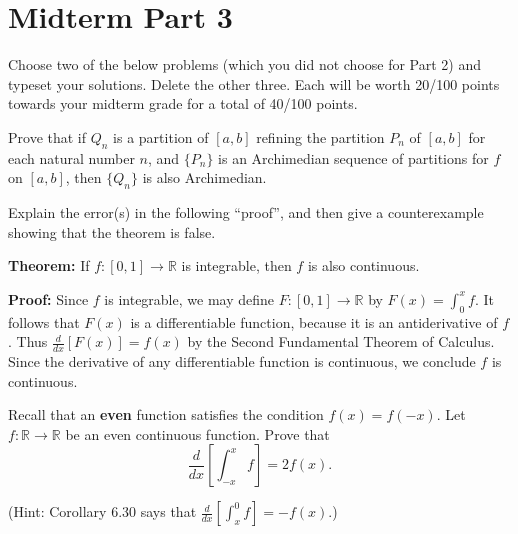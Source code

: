 \documentclass[letterpaper, twoside, 12pt]{book}
\begin{document}
\chapter*{Midterm Part 3}

Choose two of the below problems (which you did not choose for
Part 2) and typeset your solutions. Delete the other three.
Each will be worth 20/100 points towards your midterm grade
for a total of 40/100 points.


\begin{exercise}[1]
Prove that if \(Q_n\) is a partition of \([a,b]\) refining
the partition \(P_n\) of \([a,b]\) for each
natural number \(n\), and \(\{P_n\}\) is an Archimedian sequence of
partitions for \(f\) on \([a,b]\), then \(\{Q_n\}\) is also Archimedian.
\end{exercise}
\begin{solution}

\end{solution}

\begin{exercise}[2]
Explain the error(s) in the following ``proof'',
and then give a counterexample showing that the theorem is false.

\textbf{Theorem:} If \(f:[0,1]\to\mathbb R\) is integrable, then
\(f\) is also continuous.

\textbf{Proof:}
Since \(f\) is integrable, we may define \(F:[0,1]\to\mathbb R\)
by \(F(x)=\int_0^x f\). It follows
that \(F(x)\) is a differentiable function, because it is an antiderivative
of \(f\). Thus \(\frac{d}{dx}[F(x)]=f(x)\) by the Second Fundamental
Theorem of Calculus. Since the derivative of any differentiable function
is continuous, we conclude \(f\) is continuous.
\end{exercise}
\begin{solution}

\end{solution}

\begin{exercise}[3]
Recall that an \textbf{even} function satisfies the condition \(f(x)=f(-x)\).
Let \(f:\mathbb R\to\mathbb R\) be an even continuous function.
Prove that
\[
  \frac{d}{dx}\left[\int_{-x}^x f\right]=2f(x)
.\]

(Hint: Corollary 6.30 says that \(\frac{d}{dx}[\int_{x}^0f]=-f(x)\).)
\end{exercise}
\begin{solution}

\end{solution}
\end{document}
